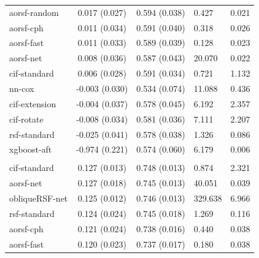 \documentclass[twoside,11pt]{article}\usepackage[]{graphicx}\usepackage[]{xcolor}
\newenvironment{knitrout}{}{} %
\begin{document}
\begin{knitrout}
\begin{longtable}[t]{lcclc}
\hspace{1em}aorsf-random & 0.017 (0.027) & 0.594 (0.038) & 0.427 & 0.021\\
\hspace{1em}aorsf-cph & 0.011 (0.034) & 0.591 (0.040) & 0.318 & 0.026\\
\hspace{1em}aorsf-fast & 0.011 (0.033) & 0.589 (0.039) & 0.128 & 0.023\\
\hspace{1em}aorsf-net & 0.008 (0.036) & 0.587 (0.043) & 20.070 & 0.022\\
\hspace{1em}cif-standard & 0.006 (0.028) & 0.591 (0.034) & 0.721 & 1.132\\
\hspace{1em}nn-cox & -0.003 (0.030) & 0.534 (0.074) & 11.088 & 0.436\\
\hspace{1em}cif-extension & -0.004 (0.037) & 0.578 (0.045) & 6.192 & 2.357\\
\hspace{1em}cif-rotate & -0.008 (0.034) & 0.581 (0.036) & 7.111 & 2.207\\
\hspace{1em}rsf-standard & -0.025 (0.041) & 0.578 (0.038) & 1.326 & 0.086\\
\hspace{1em}xgboost-aft & -0.974 (0.221) & 0.574 (0.060) & 6.179 & 0.006\\
\addlinespace[0.3em]
\hline
\multicolumn{5}{l}{\textit{\textbf{GBSG II; recurrence or death, n = 686, p = 10}}}\\
\hline
\hspace{1em}cif-standard & 0.127 (0.013) & 0.748 (0.013) & 0.874 & 2.321\\
\hspace{1em}aorsf-net & 0.127 (0.018) & 0.745 (0.013) & 40.051 & 0.039\\
\hspace{1em}obliqueRSF-net & 0.125 (0.012) & 0.746 (0.013) & 329.638 & 6.966\\
\hspace{1em}rsf-standard & 0.124 (0.024) & 0.745 (0.018) & 1.269 & 0.116\\
\hspace{1em}aorsf-cph & 0.121 (0.024) & 0.738 (0.016) & 0.440 & 0.038\\
\hspace{1em}aorsf-fast & 0.120 (0.023) & 0.737 (0.017) & 0.180 & 0.038\\

\end{longtable}
\end{knitrout}
\end{document}

